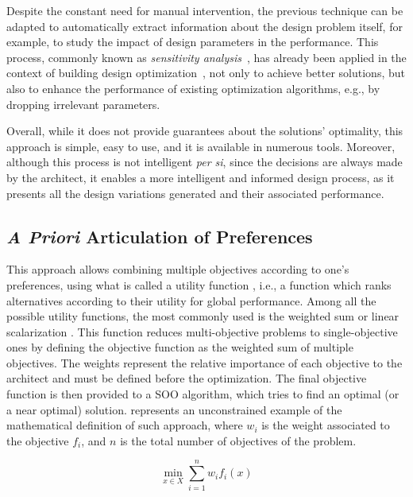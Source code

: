 	Despite the constant need for manual intervention, the previous technique can be adapted to automatically extract information about the design problem itself, for example, to study the impact of design parameters in the performance. This process, commonly known as \textit{sensitivity analysis}~\cite{Saltelli2007}, has already been applied in the context of building design optimization~\cite{Tian2013}, not only to achieve better solutions, but also to enhance the performance of existing optimization algorithms, e.g., by dropping irrelevant parameters.
	
	Overall, while it does not provide guarantees about the solutions’ optimality, this approach is simple, easy to use, and it is available in numerous tools. Moreover, although this process is not intelligent \textit{per si}, since the decisions are always made by the architect, it enables a more intelligent and informed design process, as it presents all the design variations generated and their associated performance.
	
	\subsection{\textit{A Priori} Articulation of Preferences}
	\label{subsec:preferencesarticulation}
	This approach allows combining multiple objectives according to one’s preferences, using what is called a utility function \cite{Marler2004}, i.e., a function which ranks alternatives according to their utility for global performance. Among all the possible utility functions, the most commonly used is the weighted sum or linear scalarization \cite{Wortmann2017Opossum}. This function reduces multi-objective problems to single-objective ones by defining the objective function as the weighted sum of multiple objectives. The weights represent the relative importance of each objective to the architect and must be
	defined before the optimization. The final objective function is then provided to a \ac{SOO} algorithm, which tries to find an optimal (or a near optimal) solution.  represents an unconstrained example of the mathematical definition of such approach, where $w_i$ is the weight associated to the objective $f_i$, and $n$ is the total number of objectives of the problem. 
	
	\begin{equation} \label{eq:scalarization}
	\min_{x \in X} \sum_{i=1}^n w_i f_i(x)
	\end{equation}
	
